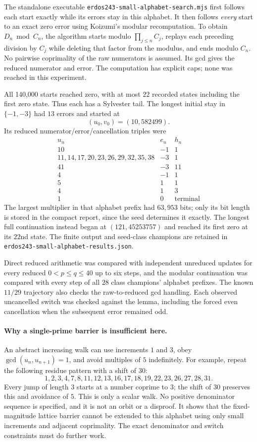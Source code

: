 \documentclass[11pt]{article}
\begin{document}
The standalone executable \texttt{erdos243-small-alphabet-search.mjs}
first follows each start exactly while its errors stay in this alphabet.
It then follows \emph{every} start to an exact zero error using Koizumi's
modular recomputation. To obtain $D_n\bmod C_n$, the algorithm starts
modulo $\prod_{j\le n}C_j$, replays each preceding division by $C_j$
while deleting that factor from the modulus, and ends modulo $C_n$.
No pairwise coprimality of the raw numerators is assumed. Its gcd gives
the reduced numerator and error. The computation has explicit caps;
none was reached in this experiment.

All 140,000 starts reached zero, with at most $22$ recorded states
including the first zero state. Thus each has a Sylvester tail.
The longest initial stay in $\{-1,-3\}$ had $13$ errors and started at
\[
 (u_0,v_0)=(10,582499).
\]
Its reduced numerator/error/cancellation triples were
\[
\begin{array}{c|c|c}
u_n&e_n&h_n\\\hline
10&-1&1\\
11,14,17,20,23,26,29,32,35,38&-3&1\\
41&-3&11\\
4&-1&1\\
5&1&1\\
4&1&3\\
1&0&\text{terminal}
\end{array}
\]
The largest multiplier in that alphabet prefix had $63,953$ bits;
only its bit length is stored in the compact report, since the seed
determines it exactly. The longest full continuation instead began at
$(121,45253757)$ and reached its first zero at its $22$nd state.
The finite output and seed-class champions are retained in
\texttt{erdos243-small-alphabet-results.json}.

Direct reduced arithmetic was compared with independent unreduced
updates for every reduced $0<p\le q\le40$ up to six steps, and the
modular continuation was compared with every step of all $28$ class
champions' alphabet prefixes. The known $11/29$ trajectory also checks
the raw-to-reduced gcd handling. Each observed uncancelled switch
was checked against the lemma, including the forced even cancellation
when the subsequent error remained odd.

\paragraph{Why a single-prime barrier is insufficient here.}
An abstract increasing walk can use increments $1$ and $3$, obey
$\gcd(u_n,u_{n+1})=1$, and avoid multiples of $5$ indefinitely.
For example, repeat the following residue pattern with a shift of $30$:
\[
 1,2,3,4,7,8,11,12,13,16,17,18,19,22,23,26,27,28,31.
\]
Every jump of length $3$ starts at a number coprime to $3$; the
shift of $30$ preserves this and avoidance of $5$.
This is only a scalar walk. No positive denominator sequence is
specified, and it is not an orbit or a disproof. It shows that the
fixed-magnitude lattice barrier cannot be extended to this alphabet
using only small increments and adjacent coprimality. The exact
denominator and switch constraints must do further work.
\end{document}
